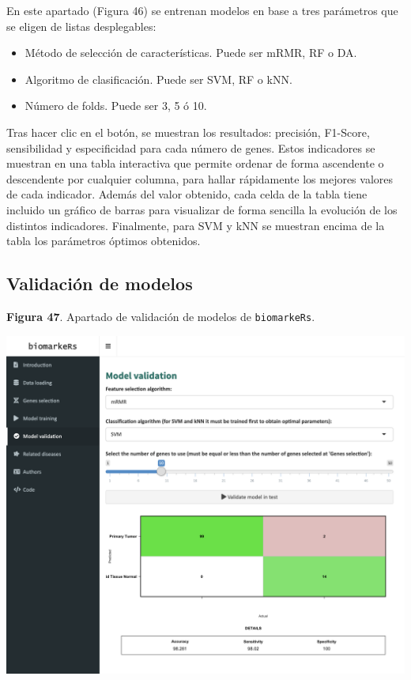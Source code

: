 En este apartado (Figura 46) se entrenan modelos en base a tres parámetros que se eligen de listas desplegables:
\begin{itemize}
	\item Método de selección de características. Puede ser mRMR, RF o DA.
	\item Algoritmo de clasificación. Puede ser SVM, RF o kNN.
	\item Número de folds. Puede ser 3, 5 ó 10.
\end{itemize}

Tras hacer clic en el botón, se muestran los resultados: precisión, F1-Score, sensibilidad y especificidad para cada número de genes. Estos indicadores se muestran en una tabla interactiva que permite ordenar de forma ascendente o descendente por cualquier columna, para hallar rápidamente los mejores valores de cada indicador. Además del valor obtenido, cada celda de la tabla tiene incluido un gráfico de barras para visualizar de forma sencilla la evolución de los distintos indicadores. Finalmente, para SVM y kNN se muestran encima de la tabla los parámetros óptimos obtenidos.

\subsection{Validación de modelos}

\begin{center}
	\textbf{Figura 47}. Apartado de validación de modelos de \texttt{biomarkeRs}.
\end{center}

\begin{center}
	\includegraphics[width=.90\textwidth]{figuras/47_model_validation.png} \\
\end{center}

